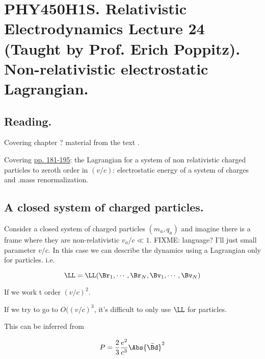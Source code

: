 
%
\usepackage{cancel}

\chapter{PHY450H1S.  Relativistic Electrodynamics Lecture 24 (Taught by Prof. Erich Poppitz).  Non-relativistic electrostatic Lagrangian.}
\label{chap:relativisticElectrodynamicsL24}
{}
\date{Mar 30, 2011}

\beginArtNoToc

\section{Reading.}

Covering chapter ? material from the text \cite{landau1980classical}.

Covering \href{http://www.physics.utoronto.ca/~poppitz/epoppitz/PHY450_files/RelEMpp181-195.pdf}{pp. 181-195}: the Lagrangian for a system of non relativistic charged particles to zeroth order in $(v/c)$: electrostatic energy of a system of charges and .mass renormalization.

\section{A closed system of charged particles.}

Consider a closed system of charged particles $(m_a, q_a)$ and imagine there is a frame where they are non-relativistic $v_a/c \ll 1$.  FIXME: language?  I'll just small parameter $v/c$.  In this case we can describe the dynamics using a Lagrangian only for particles.  i.e.

\begin{equation}\label{eqn:relativisticElectrodynamicsL24:50}
\LL = \LL( \Br_1, \cdots, \Br_N, \Bv_1, \cdots, \Bv_N)
\end{equation}

If we work t order $(v/c)^2$.

If we try to go to $O((v/c)^3$, it's difficult to only use $\LL$ for particles.

This can be inferred from 

\begin{equation}\label{eqn:relativisticElectrodynamicsL24:70}
P = \frac{2}{3} \frac{e^2}{c^3} \Abs{\ddot{\Bd}}^2
\end{equation}

